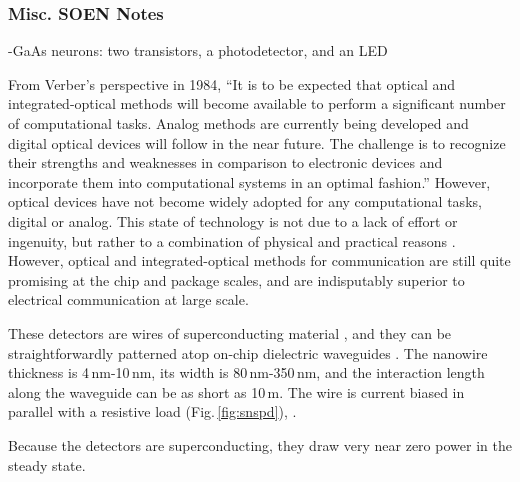 \subsubsection{Misc. SOEN Notes}

\vspace{3em}
-\cite{psbr1990}GaAs neurons: two transistors, a photodetector, and an LED

\vspace{3em}

From Verber's perspective in 1984, ``It is to be expected that optical and integrated-optical methods will become available to perform a significant number of computational tasks. Analog methods are currently being developed and digital optical devices will follow in the near future. The challenge is to recognize their strengths and weaknesses in comparison to electronic devices and incorporate them into computational systems in an optimal fashion.'' \cite{ve1984} However, optical devices have not become widely adopted for any computational tasks, digital or analog. This state of technology is not due to a lack of effort or ingenuity, but rather to a combination of physical and practical reasons \cite{ke1985}. However, optical and integrated-optical methods for communication are still quite promising at the chip \cite{suwa2015} and package \cite{} scales, and are indisputably superior to electrical communication at large scale. 


\vspace{3em}
\cite{kafe2015} 

These detectors are wires of superconducting material \cite{mave2013}, and they can be straightforwardly patterned atop on-chip dielectric waveguides \cite{shbu2017b,x,y,z}. The nanowire thickness is 4\,nm-10\,nm, its width is 80\,nm-350\,nm, and the interaction length along the waveguide can be as short as 10\,\textmu m. The wire is current biased in parallel with a resistive load (Fig.\,\ref{fig:snspd}), .

Because the detectors are superconducting, they draw very near zero power in the steady state. 

